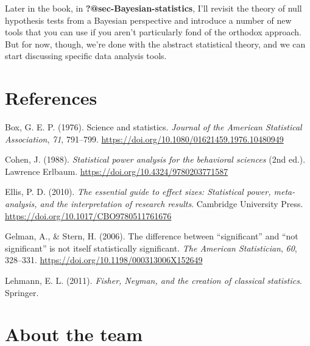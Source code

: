 \documentclass[
  a4paper,
]{book}
\newlength{\cslhangindent}
\newenvironment{CSLReferences}[2] %
 {\begin{list}{}{%
  \setlength{\itemindent}{0pt}
  \setlength{\leftmargin}{0pt}
  \setlength{\parsep}{0pt}
  \ifodd #1
   \setlength{\leftmargin}{\cslhangindent}
   \setlength{\itemindent}{-1\cslhangindent}
  \fi
  \setlength{\itemsep}{#2\baselineskip}}}
 {\end{list}}
\begin{document}
Later in the book, in \textbf{?@sec-Bayesian-statistics}, I'll revisit
the theory of null hypothesis tests from a Bayesian perspective and
introduce a number of new tools that you can use if you aren't
particularly fond of the orthodox approach. But for now, though, we're
done with the abstract statistical theory, and we can start discussing
specific data analysis tools.


\chapter*{References}\label{references}


\label{refs}
\begin{CSLReferences}{1}{0}
Box, G. E. P. (1976). Science and statistics. \emph{Journal of the
American Statistical Association}, \emph{71}, 791--799.
\url{https://doi.org/10.1080/01621459.1976.10480949}

Cohen, J. (1988). \emph{Statistical power analysis for the behavioral
sciences} (2nd ed.). Lawrence Erlbaum.
\url{https://doi.org/10.4324/9780203771587}

Ellis, P. D. (2010). \emph{The essential guide to effect sizes:
Statistical power, meta-analysis, and the interpretation of research
results}. Cambridge University Press.
\url{https://doi.org/10.1017/CBO9780511761676}

Gelman, A., \& Stern, H. (2006). The difference between
{``significant''} and {``not significant''} is not itself statistically
significant. \emph{The American Statistician}, \emph{60}, 328--331.
\url{https://doi.org/10.1198/000313006X152649}

Lehmann, E. L. (2011). \emph{Fisher, {N}eyman, and the creation of
classical statistics}. Springer.

\end{CSLReferences}

\pagebreak
\printendnotes


\chapter*{About the team}\label{about-the-team}
\end{document}
